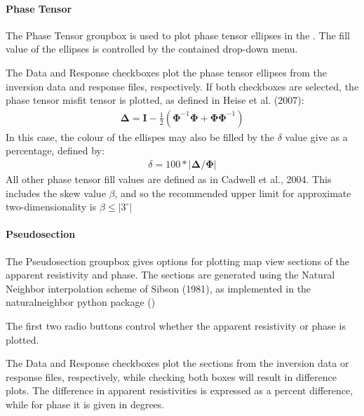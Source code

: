 \documentclass[letterpaper,10pt,english]{sphinxmanual}
\begin{document}
\paragraph{Phase Tensor}
\label{\detokenize{content/data_plot/map_viewer:phase-tensor}}
The Phase Tensor groupbox is used to plot phase tensor ellipses in the {\hyperref[\detokenize{content/data_plot/map_viewer:map-window}]{}}. The fill value of the ellipses is controlled by the contained drop-down menu.

The Data and Response checkboxes plot the phase tensor ellipses from the inversion data and response files, respectively.
If both checkboxes are selected, the phase tensor misfit tensor is plotted, as defined in Heise et al. (2007):
\begin{equation*}
\begin{split}\mathbf{\Delta} = \mathbf{I} - \frac{1}{2}(\mathbf{\Phi}^{-1}\mathbf{\Phi} + \mathbf{\Phi}\mathbf{\Phi}^{-1})\end{split}
\end{equation*}
In this case, the colour of the ellispes may also be filled by the \(\delta\) value give as a percentage, defined by:
\begin{equation*}
\begin{split}\delta = 100 * \left| \mathbf{\Delta} / \mathbf{\Phi} \right|\end{split}
\end{equation*}
All other phase tensor fill values are defined as in Cadwell et al., 2004. This includes the skew value \(\beta\), and so the recommended upper limit for approximate two-dimensionality is \(\beta \leq \left|3^{\circ} \right|\)


\paragraph{Pseudosection}
\label{\detokenize{content/data_plot/map_viewer:pseudosection}}
The Pseudosection groupbox gives options for plotting map view sections of the apparent resistivity and phase. The sections are generated using the Natural Neighbor interpolation scheme of Sibson (1981), as implemented in the naturalneighbor python package ()

The first two radio buttons control whether the apparent resistivity or phase is plotted.

The Data and Response checkboxes plot the sections from the inversion data or response files, respectively, while checking both boxes will result in difference plots. The difference in apparent resistivities is expressed as a percent difference, while for phase it is given in degrees.
\end{document}
